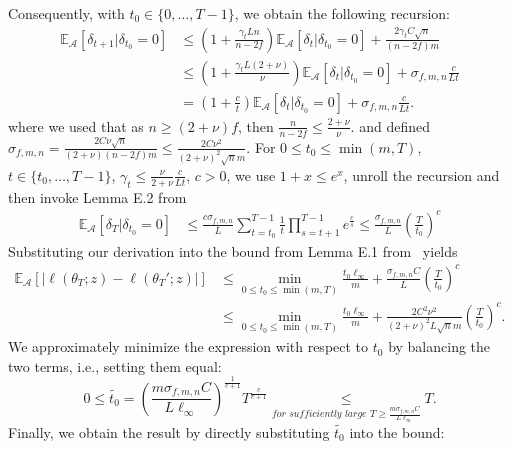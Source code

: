 \documentclass[twoside,11pt]{article}
\newcommand\mc{\mathcal}
\newcommand\mb{\mathbb}
\begin{document}
    Consequently, with $t_0 \in \{0, \ldots, T-1\}$, we obtain the following recursion:
    \begin{align*}
        \mb{E}_{\mc{A}}[\delta_{t+1}|\delta_{t_0}=0] 
        & \leq (1+\frac{\gamma_t L n}{n-2f}) \mb{E}_{\mc{A}}[\delta_{t}|\delta_{t_0}=0] + \frac{2 \gamma_t C \sqrt{n}}{(n-2f)m} \\
        & \leq (1+\frac{\gamma_t L (2+\nu)}{\nu}) \mb{E}_{\mc{A}}[\delta_{t}|\delta_{t_0}=0] + \sigma_{f, m, n} \frac{c}{Lt}\\
        & = (1+\frac{c}{t}) \mb{E}_{\mc{A}}[\delta_{t}|\delta_{t_0}=0] + \sigma_{f, m, n} \frac{c}{Lt}.
    \end{align*}
    where we used that as $n\geq (2+\nu)f$, then $\frac{n}{n-2f} \leq \frac{2+\nu}{\nu}$.
    and defined $\sigma_{f, m, n} = \frac{2C\nu\sqrt{n}}{(2+\nu)(n-2f)m} \leq \frac{2C\nu^2}{{(2+\nu)}^2\sqrt{n}m}$.
    For $0 \leq t_0 \leq \min(m, T)$, $t \in \{t_0, \ldots, T-1\}$, $\gamma_t \leq \frac{\nu}{2+\nu}\frac{c}{Lt}$, $c>0$, 
    we use $1+x \leq e^x$, unroll the recursion and then invoke Lemma E.2 from~\citet{boudou2025generalization} %
    \begin{align*}
        \mb{E}_{\mc{A}}[ \delta_{T} |\delta_{t_0}=0] 
        & \leq \frac{c \sigma_{f, m, n}}{L} \sum_{t=t_0}^{T-1} \frac{1}{t}  \prod_{s=t+1}^{T-1} e^{\frac{c}{s}}
        \leq \frac{\sigma_{f, m, n}}{L} {\left( \frac{T}{t_0} \right)}^{c}
    \end{align*}
    Substituting our derivation into the bound from Lemma E.1 from~\citet{boudou2025generalization} yields %
    \begin{align*}
        \mb{E}_{\mc{A}}[ | \ell(\theta_T;z) - \ell(\theta_T';z) | ] 
        & \leq \min_{0 \leq t_0 \leq \min(m, T)} \frac{t_0\ell_\infty}{m} + \frac{\sigma_{f, m, n}C}{L} {\left( \frac{T}{t_0} \right)}^{c} \\
        & \leq \min_{0 \leq t_0 \leq \min(m, T)} \frac{t_0\ell_\infty}{m} + \frac{2C^2\nu^2}{{(2+\nu)}^2 L \sqrt{n}m} {\left( \frac{T}{t_0} \right)}^{c}.
    \end{align*}
    We approximately minimize the expression with respect to $t_0$ by balancing the two terms, i.e., setting them equal:
    \[
        0 \leq \widetilde{t_0} = {\left( \frac{m\sigma_{f, m, n} C}{L \ell_\infty} \right)}^{\frac{1}{c+1}} T^{\frac{c}{c+1}} 
        \underset{\textit{for sufficiently large T} \geq \frac{m\sigma_{f, m, n} C}{L \ell_\infty}}{\leq} T.
    \]
    Finally, we obtain the result by directly substituting $\widetilde{t_0}$ into the bound:
\end{document}
